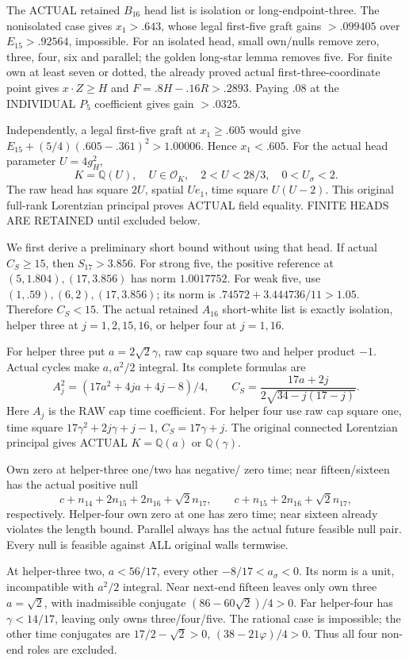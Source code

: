 \documentclass[11pt]{article}
\begin{document}
The ACTUAL retained \(B_{16}\) head list is
isolation or long-endpoint-three.
The nonisolated case gives \(x_1>.643\),
whose legal first-five graft gains \(>.099405\)
over \(E_{15}>.92564\), impossible.
For an isolated head, small own/nulls remove
zero, three, four, six and parallel;
the golden long-star lemma removes five.
For finite own at least seven or dotted, the
already proved actual first-three-coordinate
point gives \(x\cdot Z\ge H\) and
\(F=.8H-.16R>.2893\).
Paying \(.08\) at the INDIVIDUAL \(P_5\)
coefficient gives gain \(>.0325\).

Independently, a legal first-five graft at
\(x_1\ge.605\) would give
\(E_{15}+(5/4)(.605-.361)^2>1.00006\).
Hence \(x_1<.605\).
For the actual head parameter \(U=4g_H^2\),
\[
 K=\mathbb Q(U),\quad U\in\mathcal O_K,\quad
               2<U<28/3,\quad0<U_\sigma<2 .
\]
The raw head has square \(2U\), spatial \(Ue_1\),
time square \(U(U-2)\).
This original full-rank Lorentzian principal
proves ACTUAL field equality.
FINITE HEADS ARE RETAINED until excluded below.

We first derive a preliminary short bound without
using that head.
If actual \(C_S\ge15\), then \(S_{17}>3.856\).
For strong five, the positive reference at
\((5,1.804),(17,3.856)\) has norm \(1.0017752\).
For weak five, use \((1,.59),(6,2),(17,3.856)\);
its norm is \(.74572+3.444736/11>1.05\).
Therefore \(C_S<15\).
The actual retained \(A_{16}\) short-white list
is exactly isolation, helper three at
\(j=1,2,15,16\), or helper four at \(j=1,16\).

For helper three put \(a=2\sqrt2\gamma\),
raw cap square two and helper product \(-1\).
Actual cycles make \(a,a^2/2\) integral.
Its complete formulas are
\[
 A_j^2=(17a^2+4ja+4j-8)/4,\qquad
 C_S={\frac{17a+2j}{2\sqrt{34-j(17-j)}}} .
\]
Here \(A_j\) is the RAW cap time coefficient.
For helper four use raw cap square one,
time square \(17\gamma^2+2j\gamma+j-1\),
\(C_S=17\gamma+j\).
The original connected Lorentzian principal gives
ACTUAL \(K=\mathbb Q(a)\) or \(\mathbb Q(\gamma)\).

Own zero at helper-three one/two has negative/
zero time; near fifteen/sixteen has the actual
positive null
\[
 c+n_{14}+2n_{15}+2n_{16}+\sqrt2n_{17},\qquad
 c+n_{15}+2n_{16}+\sqrt2n_{17},
\]
respectively.
Helper-four own zero at one has zero time;
near sixteen already violates the length bound.
Parallel always has the actual future feasible
null pair.
Every null is feasible against ALL original
walls termwise.

At helper-three two,
\(a<56/17\), every other \(-8/17<a_\sigma<0\).
Its norm is a unit, incompatible with
\(a^2/2\) integral.
Near next-end fifteen leaves only own three
\(a=\sqrt2\), with inadmissible conjugate
\((86-60\sqrt2)/4>0\).
Far helper-four has \(\gamma<14/17\), leaving
only owns three/four/five.
The rational case is impossible;
the other time conjugates are
\(17/2-\sqrt2>0\), \((38-21\varphi)/4>0\).
Thus all four non-end roles are excluded.
\end{document}

